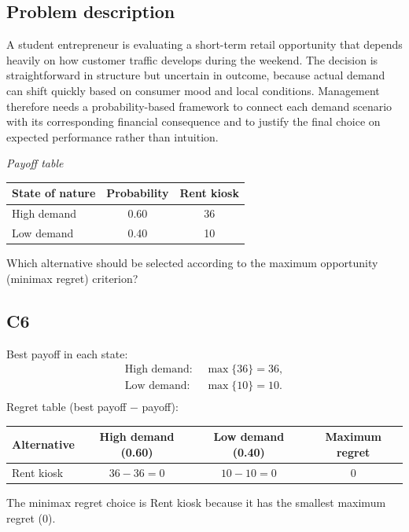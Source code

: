

	
	\begin{ExamProblems}
		\item
		\subsection*{Problem description}
		A student entrepreneur is evaluating a short-term retail opportunity that depends heavily on how customer traffic develops during the weekend. The decision is straightforward in structure but uncertain in outcome, because actual demand can shift quickly based on consumer mood and local conditions. Management therefore needs a probability-based framework to connect each demand scenario with its corresponding financial consequence and to justify the final choice on expected performance rather than intuition.

		\begin{center}
			\textit{Payoff table} \par
			\begin{tabular}{l c c}
				\toprule
				State of nature & Probability & Rent kiosk \\
				\midrule
				High demand & 0.60 & 36 \\
				Low demand & 0.40 & 10 \\
				\bottomrule
			\end{tabular}
		\end{center}

		Which alternative should be selected according to the maximum opportunity (minimax regret) criterion?

		\subsection*{C6}
		Best payoff in each state:
		\[
		\begin{aligned}
			\text{High demand: } &\max\{36\} = 36, \\
			\text{Low demand: } &\max\{10\} = 10. \\
		\end{aligned}
		\]
		Regret table (best payoff $-$ payoff):
		\begin{center}
			\begin{tabular}{l c c c}
				\toprule
				Alternative & High demand (0.60) & Low demand (0.40) & Maximum regret \\
				\midrule
				Rent kiosk & $36-36=0$ & $10-10=0$ & 0 \\
				\bottomrule
			\end{tabular}
		\end{center}
		The minimax regret choice is Rent kiosk because it has the smallest maximum regret (0).
		\item

\end{ExamProblems}
